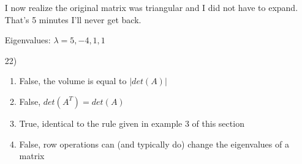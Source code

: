 \documentclass{article}
\begin{document}
\begin{enumerate}
    I now realize the original matrix was triangular
    and I did not have to expand. That's 5 minutes I'll never get
    back. 

    Eigenvalues: $\lambda = 5, -4, 1, 1$

  \item[22)]
  \begin{enumerate}
    \item
      False, the volume is equal to $|det(A)|$    
    \item 
      False, $det(A^T) = det(A)$
    \item 
      True, identical to the rule given in example 3 
      of this section
    \item 
      False, row operations can (and typically do) change
      the eigenvalues of a matrix
  \end{enumerate}
\end{enumerate}
\end{document}
